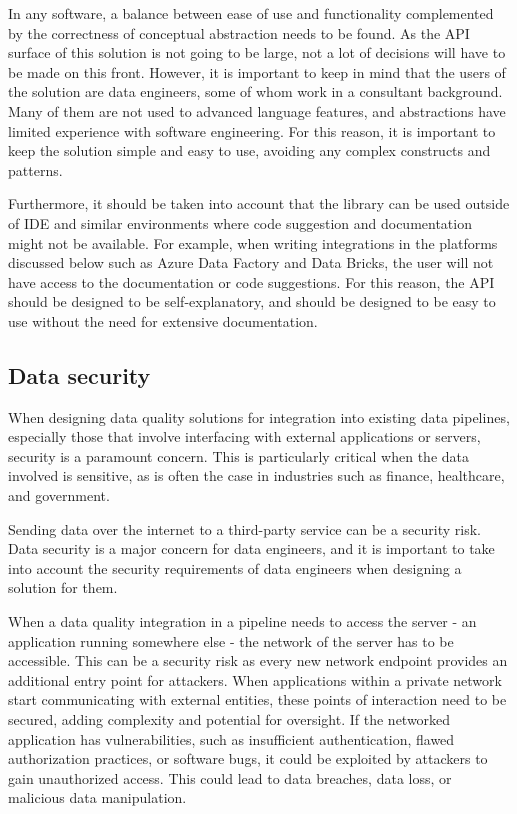 In any software, a balance between ease of use and functionality complemented by the correctness of conceptual abstraction needs to be found. As the API surface of this solution is not going to be large, not a lot of decisions will have to be made on this front. However, it is important to keep in mind that the users of the solution are data engineers, some of whom work in a consultant background. Many of them are not used to advanced language features, and abstractions have limited experience with software engineering. For this reason, it is important to keep the solution simple and easy to use, avoiding any complex constructs and patterns.

Furthermore, it should be taken into account that the library can be used outside of IDE and similar environments where code suggestion and documentation might not be available. For example, when writing integrations in the platforms discussed below such as Azure Data Factory and Data Bricks, the user will not have access to the documentation or code suggestions. For this reason, the API should be designed to be self-explanatory, and should be designed to be easy to use without the need for extensive documentation.

\subsection{Data security}

When designing data quality solutions for integration into existing data pipelines, especially those that involve interfacing with external applications or servers, security is a paramount concern. This is particularly critical when the data involved is sensitive, as is often the case in industries such as finance, healthcare, and government.

Sending data over the internet to a third-party service can be a security risk. Data security is a major concern for data engineers, and it is important to take into account the security requirements of data engineers when designing a solution for them.

When a data quality integration in a pipeline needs to access the server - an application running somewhere else - the network of the server has to be accessible. This can be a security risk as every new network endpoint provides an additional entry point for attackers. When applications within a private network start communicating with external entities, these points of interaction need to be secured, adding complexity and potential for oversight.  If the networked application has vulnerabilities, such as insufficient authentication, flawed authorization practices, or software bugs, it could be exploited by attackers to gain unauthorized access. This could lead to data breaches, data loss, or malicious data manipulation. 


